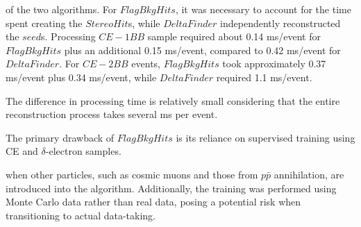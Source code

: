 of the 
two algorithms. For $FlagBkgHits$, it was necessary to account for the time 
spent creating the $StereoHit$s, while $DeltaFinder$ independently 
reconstructed the $seed$s. Processing $CE-1BB$ sample required about 
0.14 ms/event for $FlagBkgHits$ plus an additional 0.15 ms/event, 
compared to 0.42 ms/event for $DeltaFinder$. For $CE-2BB$ events, 
$FlagBkgHits$ took approximately 0.37 ms/event plus 0.34 ms/event, 
while $DeltaFinder$ required 1.1 ms/event. 

The difference in processing time 
is relatively small considering that the entire reconstruction process 
takes several ms per event.

The primary drawback of $FlagBkgHits$ is its reliance 
on supervised training using CE and $\delta$-electron samples. 

when other particles, such as cosmic muons 
and those from $p\bar{p}$ annihilation, are introduced into the algorithm. 
Additionally, the training was performed using Monte Carlo data 
rather than real data, posing a potential risk when transitioning 
to actual data-taking. 

